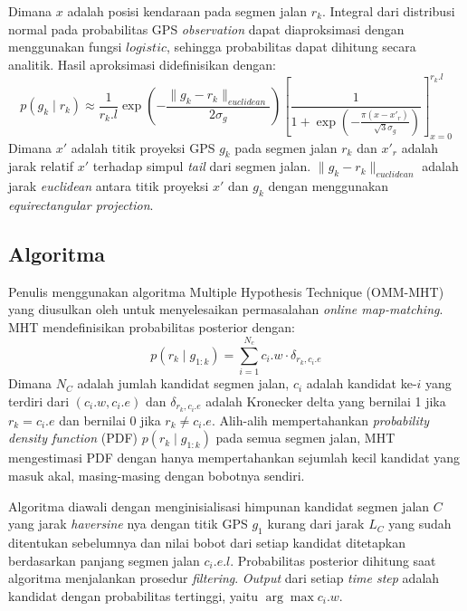 Dimana $x$ adalah posisi kendaraan pada segmen jalan $r_k$. Integral dari distribusi normal pada probabilitas GPS \textit{observation} dapat diaproksimasi dengan menggunakan fungsi $logistic$, sehingga probabilitas dapat dihitung secara analitik. Hasil aproksimasi didefinisikan dengan:
\begin{equation}
    p(g_k\mid r_k) \approx \frac{1}{r_k.l} \exp \left(-\frac{\lVert g_k-r_k\rVert_{euclidean}}{2\sigma_g}\right)\left[ \frac{1}{1+\exp (-\frac{\pi(x-x'_r)}{\sqrt{3}\sigma_g})} \right]_{x=0}^{r_k.l}
\end{equation}
Dimana $x'$ adalah titik proyeksi GPS $g_k$ pada segmen jalan $r_k$ dan $x'_r$ adalah jarak relatif $x'$ terhadap simpul \textit{tail} dari segmen jalan. $\lVert g_k-r_k\rVert_{euclidean}$ adalah jarak \textit{euclidean} antara titik proyeksi $x'$ dan $g_k$ dengan menggunakan \textit{equirectangular projection}.

\subsection{Algoritma}
\label{subsec:omm-algoritma}
Penulis menggunakan algoritma Multiple Hypothesis Technique (OMM-MHT) yang diusulkan oleh \cite{Taguchi2019} untuk menyelesaikan permasalahan \textit{online map-matching}. MHT mendefinisikan probabilitas posterior dengan:
\begin{equation}
    p(r_k\mid g_{1:k})=\sum_{i=1}^{N_c}c_i.w\cdot \delta_{r_{k},c_i.e}
\end{equation}
Dimana $N_C$ adalah jumlah kandidat segmen jalan, $c_i$ adalah kandidat ke-$i$ yang terdiri dari $(c_i.w, c_i.e)$ dan $\delta_{r_{k},c_i.e}$ adalah Kronecker delta yang bernilai 1 jika $r_{k}=c_i.e$ dan bernilai 0 jika $r_{k}\neq c_i.e$. Alih-alih mempertahankan \textit{probability density function} (PDF) $p(r_k\mid g_{1:k})$ pada semua segmen jalan, MHT mengestimasi PDF dengan hanya mempertahankan sejumlah kecil kandidat yang masuk akal, masing-masing dengan bobotnya sendiri. 

Algoritma diawali dengan menginisialisasi himpunan kandidat segmen jalan $C$ yang jarak \textit{haversine} nya dengan titik GPS $g_1$ kurang dari jarak $L_C$ yang sudah ditentukan sebelumnya dan nilai bobot dari setiap kandidat ditetapkan berdasarkan panjang segmen jalan $c_i.e.l$. Probabilitas posterior dihitung saat algoritma menjalankan prosedur \textit{filtering}. \textit{Output} dari setiap \textit{time step} adalah kandidat dengan probabilitas tertinggi, yaitu $\arg \max c_i.w$.

